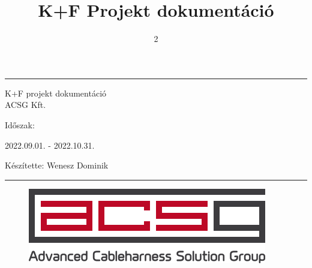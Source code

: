 \documentclass{article}
\title{K+F Projekt dokumentáció}
\author{}
\date{2}
\begin{document}

\begin{center}
    \hrule
    \vspace{0.5cm}
    \begin{Huge}
    K+F projekt dokumentáció\\
    ACSG Kft.\\
    \end{Huge}
    \vspace{0.5cm}
    \begin{huge}
    Időszak:\\
    \end{huge}
    \begin{Large}
    2022.09.01. - 2022.10.31.\\
    \end{Large} \vspace{10pt}
    \begin{large}
    Készítette: Wenesz Dominik\\
    \end{large}\vspace{0.5cm}
    \hrule
    
  \end{center}
  \begin{figure}[b]
      \centering
      \includegraphics[]{acsg.png}
  \end{figure}
  


\thispagestyle{empty}
\setcounter{page}{0}




\newpage
\tableofcontents
\newpage
\end{document}
